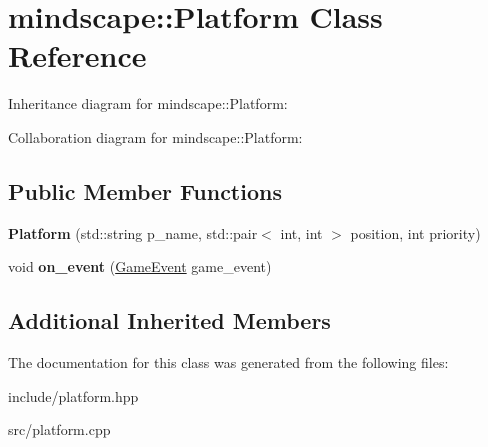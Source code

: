 \hypertarget{classmindscape_1_1_platform}{}\section{mindscape\+:\+:Platform Class Reference}
\label{classmindscape_1_1_platform}


Inheritance diagram for mindscape\+:\+:Platform\+:


Collaboration diagram for mindscape\+:\+:Platform\+:
\subsection*{Public Member Functions}
\begin{DoxyCompactItemize}
\item 
{\bfseries Platform} (std\+::string p\+\_\+name, std\+::pair$<$ int, int $>$ position, int priority)\hypertarget{classmindscape_1_1_platform_aebeb96487bd3261d8c9c1046aa225630}{}\label{classmindscape_1_1_platform_aebeb96487bd3261d8c9c1046aa225630}

\item 
void {\bfseries on\+\_\+event} (\hyperlink{class_game_event}{Game\+Event} game\+\_\+event)\hypertarget{classmindscape_1_1_platform_a6216741f82664014836e0d8a44a6cf9b}{}\label{classmindscape_1_1_platform_a6216741f82664014836e0d8a44a6cf9b}

\end{DoxyCompactItemize}
\subsection*{Additional Inherited Members}


The documentation for this class was generated from the following files\+:\begin{DoxyCompactItemize}
\item 
include/platform.\+hpp\item 
src/platform.\+cpp\end{DoxyCompactItemize}
